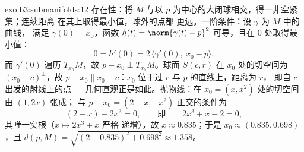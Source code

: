 \begin{solution}{exo:b3:submanifolds:12}
存在性：将 $M$ 与以
$p$ 为中心的大闭球相交，得一非空紧集；连续距离
在其上取得最小值，球外的点都
更远。一阶条件：设 $\gamma$ 为 $M$ 中的曲线，
满足 $\gamma(0) = x_0$，函数 $h(t) = \norm{\gamma(t)
- p}^2$ 可导，且在 $0$ 处取得最小值：
\[
0 = h'(0) = 2\,\langle\gamma'(0),\ x_0 - p\rangle,
\]
而 $\gamma'(0)$ 遍历 $T_{x_0}M$，故 $p - x_0 \perp
T_{x_0}M$。球面 $S(c, r)$ 在 $x_0$ 处的切空间为
$(x_0 - c)^\perp$，故 $p - x_0 \parallel x_0 - c$：$x_0$
位于过 $c$ 与 $p$ 的直线上，距离为 $r$，
即自 $c$ 出发的射线上的点 --- 几何直观正是如此。抛物线：在
$x_0 = (x, x^2)$ 处的切空间由 $(1, 2x)$ 张成；
与 $p - x_0 = (2 - x, -x^2)$ 正交的条件为
\[
(2 - x) - 2x^3 = 0,
\qquad\text{即}\qquad 2x^3 + x - 2 = 0,
\]
其唯一实根（$x \mapsto 2x^3 + x$ 严格
递增），故 $x \approx 0.835$；于是 $x_0 \approx (0.835,
0.698)$，且 $d(p, M) = \sqrt{(2 - 0.835)^2 + 0.698^2}
\approx 1.358$。
\end{solution}

